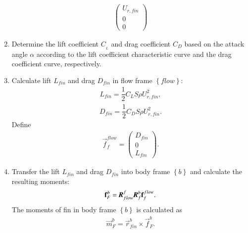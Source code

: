 \begin{enumerate}
\begin{align}
\begin{pmatrix}
U_{r,fin}\\0\\0
\end{pmatrix}
\end{align}
\item Determine the lift coefficient $C_{_{L}}$ and drag coefficient $C_{D}$ based on the attack angle $\alpha$ according to the lift coefficient characteristic curve and the drag coefficient curve, respectively.
\item Calculate lift $L_{fin}$ and drag $D_{fin}$ in flow frame $\left\{ flow \right\}$:
\begin{align}
L_{fin}=\dfrac{1}{2}C_{L}S \rho U_{r,fin}^{2},
\end{align}
\begin{align}
D_{fin}=\dfrac{1}{2}C_{D}S \rho U_{r,fin}^{2}.
\end{align}
Define
\begin{align}
\vec{f}^{flow}_{f}=\begin{pmatrix}
D_{fin}\\0\\L_{fin}
\end{pmatrix}.
\end{align}
\item Transfer the lift $L_{fin}$ and drag $D_{fin}$ into body frame $\left\{ b \right\}$ and calculate the resulting moments:
\begin{align}
\vec{f}^{b}_{F}=\emph{\textbf{R}}_{flow}^{f}\emph{\textbf{R}}_{f}^{b}\vec{f}^{flow}_{f}.
\end{align}
The moments of fin in body frame $\left\{ b \right\}$ is calculated as
\begin{align}
\vec{m}^{b}_{F}=\vec{r}_{fin}^{b}\times \vec{f}^{b}_{F}.
\end{align}
\end{enumerate}
